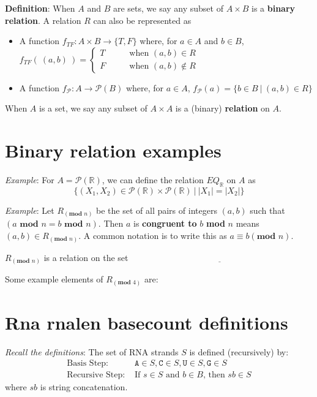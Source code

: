 \documentclass[12pt, oneside]{article}
\newcommand{\A}[0]{\texttt{A}}
\newcommand{\C}[0]{\texttt{C}}
\newcommand{\G}[0]{\texttt{G}}
\newcommand{\U}[0]{\texttt{U}}
\begin{document}
{\bf Definition}: When $A$ and $B$ are sets, we say any subset of $A \times B$ is a {\bf binary relation}. 
A relation $R$ can also be represented as

\begin{itemize}
\item A function $f_{TF} : A \times B \to \{T, F\}$
where, for $a \in A$ and $b \in B$, $f_{TF}(~(a,b)~) = 
\begin{cases} 
    T \qquad&\text{when } (a,b) \in R \\
    F \qquad&\text{when } (a,b) \notin R
\end{cases}$
\item A function $f_{\mathcal{P}} : A   \to \mathcal{P}(B)$ where, for $a \in A$, 
$f_{\mathcal{P}}( a ) = \{ b \in B ~|~ (a,b) \in R \}$
\end{itemize}

When $A$ is a set, we say any subset of $A \times A$ is a (binary) {\bf relation} on $A$.

 \vfill
\section*{Binary relation examples}


{\it Example}: For $A = \mathcal{P}(\mathbb{R})$, we can define the relation $EQ_{\mathbb{R}}$ on $A$ as 
\[
\{ (X_1, X_2 ) \in\mathcal{P}(\mathbb{R})  \times \mathcal{P}(\mathbb{R}) ~|~ |X_1| = |X_2| \}
\]

\vfill

{\it Example}: Let $R_{(\textbf{mod } n)}$ be the set of all pairs of integers $(a, b)$ such that $(a \textbf{ mod } n = b \textbf{ mod } n)$.
Then $a$ is {\bf congruent to} $b$ \textbf{mod} $n$ means $(a, b) \in R_{(\textbf{mod } n)}$. A common notation is to write this as $a \equiv b (\textbf{mod } n)$.


$R_{(\textbf{mod } n)}$ is a relation on the set $\underline{\phantom{\mathbb{Z}}\hspace{20em}}$


Some example elements of $R_{(\textbf{mod } 4)}$ are: 

\vfill \vfill
\section*{Rna rnalen basecount definitions}


{\it Recall the definitions}: The set of RNA strands $S$ is defined (recursively) by:
\[
\begin{array}{ll}
\textrm{Basis Step: } & \A \in S, \C \in S, \U \in S, \G \in S \\
\textrm{Recursive Step: } & \textrm{If } s \in S\textrm{ and }b \in B \textrm{, then }sb \in S
\end{array}
\]
where $sb$ is string concatenation.
\end{document}
